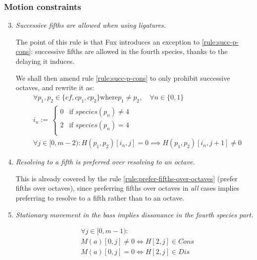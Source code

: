 \subsubsection{Motion constraints}
\begin{enumerate}[wide, label=\bfseries 4.P\arabic*]
\setcounter{enumi}{2}
    \item \textit{Successive fifths are allowed when using ligatures.} \label{constraint:successive-fifths-in-4th-species}    

    The point of this rule is that Fux introduces an exception to \ref{rule:succ-p-cons}: successive fifths are allowed in the fourth species, thanks to the delaying it induces.

    We shall then amend rule \ref{rule:succ-p-cons} to only prohibit successive octaves, and rewrite it as:
    \begin{equation} \begin{aligned}
        &\forall p_1, p_2 \in \{cf, cp_1, cp_2\} \text{where}p_1 \neq p_2, \quad \forall n \in \{0, 1\} \\
        &i_n := \,  
        \begin{cases}
            0 & \text{if } species(p_n) \neq 4\\
            2 & \text{if } species(p_n) = 4\\
        \end{cases}\\
        &\forall j \in [0, m-2) \colon H(p_1,p_2)[i_n, j] = 0 \implies H(p_1,p_2)[i_n, j+1] \neq 0
    \end{aligned} \end{equation}

    \item \textit{Resolving to a fifth is preferred over resolving to an octave.} \label{constraint:resolving-to-fifths-rather-than-octaves}    
    
    This is already covered by the rule \ref{rule:prefer-fifths-over-octaves} (prefer fifths over octaves), since preferring fifths over octaves in \textit{all} cases implies preferring to resolve to a fifth rather than to an octave.

    \item \textit{Stationary movement in the bass implies dissonance in the fourth species part.} \label{constraint:dissonance-in-4th-species}

    \begin{equation}
        \begin{aligned}
        &\forall j \in [0, m-1):\\
        &M(a)[0, j] \neq 0 \iff H[2, j] \in Cons\\
        &M(a)[0, j] = 0 \iff H[2, j] \in Dis
        \end{aligned}
        \label{eq:arsiscons} 
    \end{equation}        



\end{enumerate}
